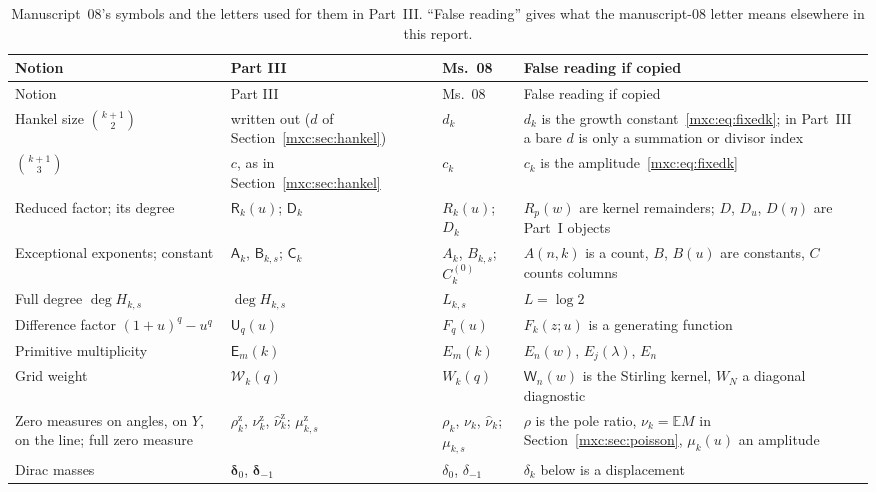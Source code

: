 \documentclass[11pt]{article}
\numberwithin{equation}{section}
\theoremstyle{definition}
\theoremstyle{remark}
\newcommand{\E}{\mathbb E}
\newcommand{\hzrho}{\rho^{\mathrm z}}
\newcommand{\hznu}{\nu^{\mathrm z}}
\newcommand{\hzhnu}{\widehat\nu^{\mathrm z}}
\newcommand{\hzmu}{\mu^{\mathrm z}}
\begin{document}
{\small
\setlength{\LTcapwidth}{\textwidth}
\begin{longtable}{@{}>{\raggedright\arraybackslash}p{}>{\raggedright\arraybackslash}p{}>{\raggedright\arraybackslash}p{}>{\raggedright\arraybackslash}p{}@{}}
\caption{Manuscript~08's symbols and the letters used for them in Part~III.
``False reading'' gives what the manuscript-08 letter means elsewhere in
this report.}\label{mxc:hz:tab:dictionary}\\
\toprule
Notion & Part III & Ms.~08 & False reading if copied\\
\midrule
\endfirsthead
\toprule
Notion & Part III & Ms.~08 & False reading if copied\\
\midrule
\endhead
\bottomrule
\endfoot
Hankel size $\binom{k+1}2$ & written out ($d$ of Section~\ref{mxc:sec:hankel}) & $d_k$ & $d_k$ is the growth constant~\eqref{mxc:eq:fixedk}; in Part~III a bare $d$ is only a summation or divisor index\\
$\binom{k+1}3$ & $c$, as in Section~\ref{mxc:sec:hankel} & $c_k$ & $c_k$ is the amplitude~\eqref{mxc:eq:fixedk}\\
Reduced factor; its degree & $\mathsf R_k(u)$; $\mathsf D_k$ & $R_k(u)$; $D_k$ & $R_p(w)$ are kernel remainders; $D$, $D_u$, $D(\eta)$ are Part~I objects\\
Exceptional exponents; constant & $\mathsf A_k$, $\mathsf B_{k,s}$; $\mathsf C_k$ & $A_k$, $B_{k,s}$; $C_k^{(0)}$ & $A(n,k)$ is a count, $B$, $B(u)$ are constants, $C$ counts columns\\
Full degree $\deg H_{k,s}$ & $\deg H_{k,s}$ & $L_{k,s}$ & $L=\log2$\\
Difference factor $(1+u)^q-u^q$ & $\mathsf U_q(u)$ & $F_q(u)$ & $F_k(z;u)$ is a generating function\\
Primitive multiplicity & $\mathsf E_m(k)$ & $E_m(k)$ & $E_n(w)$, $E_j(\lambda)$, $E_n$\\
Grid weight & $\mathcal W_k(q)$ & $W_k(q)$ & $\mathsf W_n(w)$ is the Stirling kernel, $W_N$ a diagonal diagnostic\\
Zero measures on angles, on $Y$, on the line; full zero measure & $\hzrho_k$, $\hznu_k$, $\hzhnu_k$; $\hzmu_{k,s}$ & $\rho_k$, $\nu_k$, $\widehat\nu_k$; $\mu_{k,s}$ & $\rho$ is the pole ratio, $\nu_k=\E M$ in Section~\ref{mxc:sec:poisson}, $\mu_k(u)$ an amplitude\\
Dirac masses & $\boldsymbol\delta_0$, $\boldsymbol\delta_{-1}$ & $\delta_0$, $\delta_{-1}$ & $\delta_k$ below is a displacement\\

\end{longtable}}
\end{document}
